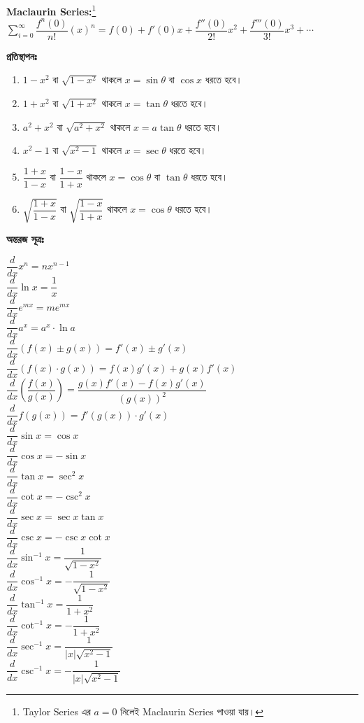 \documentclass[a4paper,12pt]{article}
\newcommand{\dd}{\displaystyle}
\newcommand{\lt}{\left}
\newcommand{\rt}{\right}
\newcommand{\tm}{\item}
\newcommand{\eng}{\textenglish}
\begin{document}
\textbf{\eng{Maclaurin Series:}}\footnote{\eng{Taylor Series} এর $a=0$ নিলেই \eng{Maclaurin Series} পাওয়া যায়।} $\dd \sum_{i=0}^{\infty} \dfrac{f^n(0)}{n!}(x)^n=f(0)+f'(0)x+\dfrac{f''(0)}{2!}x^2+\dfrac{f'''(0)}{3!}x^3+\cdots$

\textbf{প্রতিস্থাপনঃ}

\begin{enumerate}[ wide=0em, label=\textenglish{\textbf{ \arabic* .}}, itemsep=0pt, parsep=1ex]
    \tm $1-x^2$ বা $\sqrt{1-x^2}$ থাকলে $x=\sin \theta \text{ বা } \cos x$ ধরতে হবে। 

    \tm $1+x^2$ বা $\sqrt{1+x^2}$ থাকলে $x=\tan \theta $ ধরতে হবে। 

    \tm $a^2+x^2$ বা $\sqrt{a^2+x^2}$ থাকলে $x=a \tan \theta $ ধরতে হবে। 

    \tm $x^2-1$ বা $\sqrt{x^2-1}$ থাকলে $x=\sec \theta $ ধরতে হবে। 

    \tm $\dfrac{1+x}{1-x}$ বা $\dfrac{1-x}{1+x}$ থাকলে $x=\cos \theta \text{ বা } \tan \theta$ ধরতে হবে। 

    \tm $\sqrt{\dfrac{1+x}{1-x}}$ বা $\sqrt{\dfrac{1-x}{1+x}}$ থাকলে $x=\cos \theta $ ধরতে হবে। 
\end{enumerate}

\textbf{অন্তরজ সূত্রঃ}

\begin{multicols}{2}

     $\dfrac{d}{dx} x^n = nx^{n-1}$ \\
     $\dfrac{d}{dx} \ln x = \dfrac{1}{x}$ \\
     $\dfrac{d}{dx} e^{mx} = me^{mx}$ \\
     $\dfrac{d}{dx} a^x = a^x \cdot \ln a$ \\
     $\dfrac{d}{dx} (f(x) \pm g(x)) = f'(x) \pm g'(x)$ \\
     $\dfrac{d}{dx} (f(x) \cdot g(x)) = f(x)g'(x) + g(x)f'(x)$ \\
     $\dfrac{d}{dx} \lt(\dfrac{f(x)}{g(x)}\rt) = \dfrac{g(x)f'(x)-f(x)g'(x)}{(g(x))^2}$ \\
     $\dfrac{d}{dx} f(g(x))=f'(g(x))\cdot g'(x)$ \\
     $\dfrac{d}{dx} \sin x = \cos x$ \\
     $\dfrac{d}{dx} \cos x = - \sin x $\\
     $\dfrac{d}{dx} \tan x = \sec^2x$ \\
     $\dfrac{d}{dx} \cot x = -\csc^2x$ \\
     $\dfrac{d}{dx} \sec x = \sec x \tan x$ \\
     $\dfrac{d}{dx} \csc x = - \csc x \cot x$ \\
     $\dfrac{d}{dx} \sin ^{-1} x = \dfrac{1}{\sqrt{1-x^2}}$ \\
     $\dfrac{d}{dx} \cos ^{-1} x = -\dfrac{1}{\sqrt{1-x^2}}$ \\
     $\dfrac{d}{dx} \tan ^{-1} x = \dfrac{1}{1+x^2}$ \\
     $\dfrac{d}{dx} \cot ^{-1} x = -\dfrac{1}{1+x^2}$\\
     $\dfrac{d}{dx} \sec ^{-1} x = \dfrac{1}{|x|\sqrt{x^2-1}}$  \\
     $\dfrac{d}{dx} \csc ^{-1} x = -\dfrac{1}{|x|\sqrt{x^2-1}}$ 
\end{multicols}
\end{document}
